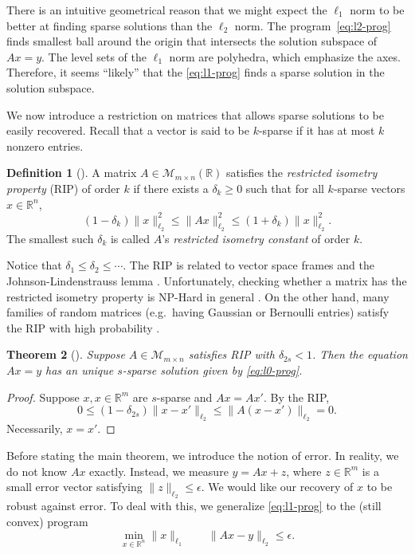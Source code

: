 \documentclass{article}
\newtheorem{theorem}{Theorem}[section]
\theoremstyle{definition}
\newtheorem{definition}[theorem]{Definition}
\newcommand{\defterm}[1]{\textit{#1}}
\begin{document}
There is an intuitive geometrical reason that we might expect the $\ell_1$ norm to be better at finding sparse solutions than the $\ell_2$ norm. The program~\eqref{eq:l2-prog} finds smallest ball around the origin that intersects the solution subspace of $Ax = y$. The level sets of the $\ell_1$ norm are polyhedra, which emphasize the axes. Therefore, it seems ``likely'' that the \eqref{eq:l1-prog} finds a sparse solution in the solution subspace.

We now introduce a restriction on matrices that allows sparse solutions to be easily recovered. Recall that a vector is said to be $k$-sparse if it has at most $k$ nonzero entries.
\begin{definition}[\cite{ct-decoding}]
A matrix $A \in \mathcal{M}_{m\times n}(\mathbb{R})$ satisfies the \defterm{restricted isometry property} (RIP) of order $k$ if there exists a $\delta_k \geq 0$ such that for all $k$-sparse vectors $x \in \mathbb{R}^n$, $$(1 - \delta_k)\|x\|_{\ell_2}^2 \leq \|Ax\|_{\ell_2}^2 \leq (1 + \delta_k)\|x\|_{\ell_2}^2.$$
The smallest such $\delta_k$ is called $A$'s \defterm{restricted isometry constant} of order $k$.
\end{definition}
Notice that $\delta_1 \leq \delta_2 \leq \dotsb$. The RIP is related to vector space frames \cite{ole-frames} and the Johnson-Lindenstrauss lemma \cite{rip-jl}. Unfortunately, checking whether a matrix has the restricted isometry property is NP-Hard in general \cite{rip-np}. On the other hand, many families of random matrices (e.g.\ having Gaussian or Bernoulli entries) satisfy the RIP with high probability \cite[\S 1.3]{ctr-stable}.

\begin{theorem}[{\cite[lemma 1.2]{ct-decoding}}]\label{thm:unique-sparse}
Suppose $A \in \mathcal{M}_{m\times n}$ satisfies RIP with $\delta_{2s} < 1$. Then the equation $Ax = y$ has an unique $s$-sparse solution given by \eqref{eq:l0-prog}.
\end{theorem}
\begin{proof}
Suppose $x, x\in \mathbb{R}^m$ are $s$-sparse and $Ax = Ax'$. By the RIP,
$$
0 \leq (1 - \delta_{2s})\|x - x'\|_{\ell_2} \leq \|A(x - x')\|_{\ell_2} = 0.
$$
Necessarily, $x = x'$.
\end{proof}

Before stating the main theorem, we introduce the notion of error. In reality, we do not know $Ax$ exactly. Instead, we measure $y = Ax + z$, where $z \in \mathbb{R}^m$ is a small error vector satisfying $\|z\|_{\ell_2} \leq \epsilon$. We would like our recovery of $x$ to be robust against error. To deal with this, we generalize \eqref{eq:l1-prog} to the (still convex) program
\begin{equation}\tag{P\textquotesingle}\label{eq:l1-approx}
\min_{x \in \mathbb{R}^n}\|x\|_{\ell_1}\qquad \|Ax - y\|_{\ell_2} \leq \epsilon.
\end{equation}
\end{document}
